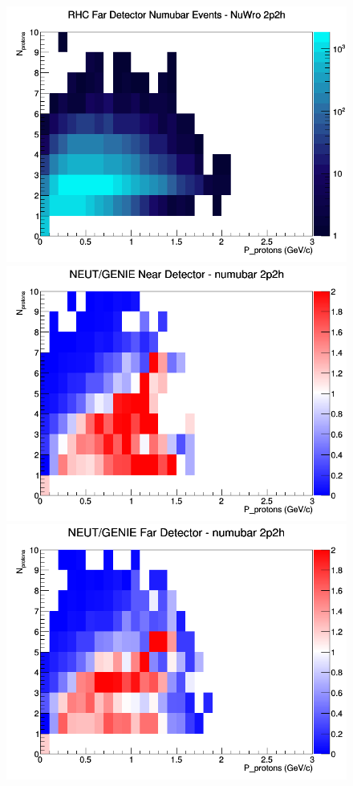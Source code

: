 \documentclass[12pt]{article}
\begin{document}
\begin{figure}[h]
\endminipage
{}
\includegraphics[width=\linewidth]{N_P/nominal/protons/2p2h_RHC_FD_numubar_N_P_NuWro.png}
\endminipage
\newline
{}
\includegraphics[width=\linewidth]{N_P/nominal/protons/ratios/2p2h_NEUT_GENIE_numubar_near_N_P.png}
\endminipage
{}
\includegraphics[width=\linewidth]{N_P/nominal/protons/ratios/2p2h_NEUT_GENIE_numubar_far_N_P.png}

\end{figure}
\end{document}
